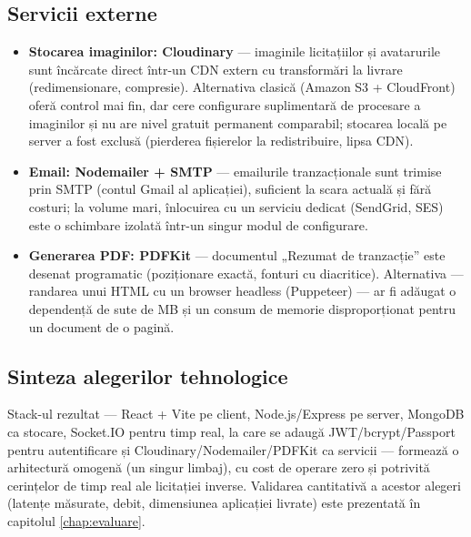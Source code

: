 \subsection{Servicii externe}

\begin{itemize}
    \item \textbf{Stocarea imaginilor: Cloudinary} --- imaginile licitațiilor și avatarurile sunt încărcate direct într-un CDN extern cu transformări la livrare (redimensionare, compresie). Alternativa clasică (Amazon S3 + CloudFront) oferă control mai fin, dar cere configurare suplimentară de procesare a imaginilor și nu are nivel gratuit permanent comparabil; stocarea locală pe server a fost exclusă (pierderea fișierelor la redistribuire, lipsa CDN).
    \item \textbf{Email: Nodemailer + SMTP} --- emailurile tranzacționale sunt trimise prin SMTP (contul Gmail al aplicației), suficient la scara actuală și fără costuri; la volume mari, înlocuirea cu un serviciu dedicat (SendGrid, SES) este o schimbare izolată într-un singur modul de configurare.
    \item \textbf{Generarea PDF: PDFKit} --- documentul „Rezumat de tranzacție'' este desenat programatic (poziționare exactă, fonturi cu diacritice). Alternativa --- randarea unui HTML cu un browser headless (Puppeteer) --- ar fi adăugat o dependență de sute de MB și un consum de memorie disproporționat pentru un document de o pagină.
\end{itemize}

\subsection{Sinteza alegerilor tehnologice}

Stack-ul rezultat --- React + Vite pe client, Node.js/Express pe server, MongoDB ca stocare, Socket.IO pentru timp real, la care se adaugă JWT/bcrypt/Passport pentru autentificare și Cloudinary/Nodemailer/PDFKit ca servicii --- formează o arhitectură omogenă (un singur limbaj), cu cost de operare zero și potrivită cerințelor de timp real ale licitației inverse. Validarea cantitativă a acestor alegeri (latențe măsurate, debit, dimensiunea aplicației livrate) este prezentată în capitolul \ref{chap:evaluare}.

